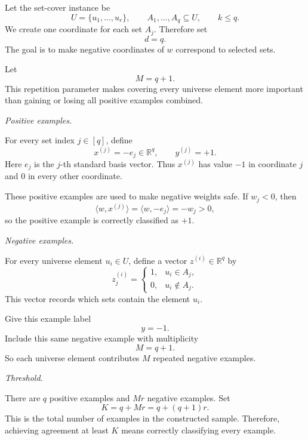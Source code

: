 \documentclass[11pt]{article}
\begin{document}
\begin{enumerate}
\begin{solutionbox}
        Let the set-cover instance be
        \[
        U=\{u_1,\ldots,u_r\},
        \qquad
        A_1,\ldots,A_q\subseteq U,
        \qquad
        k\le q.
        \]
        We create one coordinate for each set $A_j$. Therefore set
        \[
        d=q.
        \]
        The goal is to make negative coordinates of $w$ correspond to selected sets.

        Let
        \[
        M=q+1.
        \]
        This repetition parameter makes covering every universe element more important than
        gaining or losing all positive examples combined.

        \medskip

        \textit{Positive examples.}

        For every set index $j\in[q]$, define
        \[
        x^{(j)}=-e_j\in\mathbb{R}^q,
        \qquad
        y^{(j)}=+1.
        \]
        Here $e_j$ is the $j$-th standard basis vector. Thus $x^{(j)}$ has value $-1$ in
        coordinate $j$ and $0$ in every other coordinate.

        These positive examples are used to make negative weights safe. If $w_j<0$, then
        \[
        \langle w,x^{(j)}\rangle
        =
        \langle w,-e_j\rangle
        =
        -w_j
        >
        0,
        \]
        so the positive example is correctly classified as $+1$.

        \medskip

        \textit{Negative examples.}

        For every universe element $u_i\in U$, define a vector $z^{(i)}\in\mathbb{R}^q$ by
        \[
        z^{(i)}_j
        =
        \begin{cases}
        1, & u_i\in A_j,\\
        0, & u_i\notin A_j.
        \end{cases}
        \]
        This vector records which sets contain the element $u_i$.

        Give this example label
        \[
        y=-1.
        \]
        Include this same negative example with multiplicity
        \[
        M=q+1.
        \]
        So each universe element contributes $M$ repeated negative examples.

        \medskip

        \textit{Threshold.}

        There are $q$ positive examples and $Mr$ negative examples. Set
        \[
        \boxed{
        K=q+Mr=q+(q+1)r.
        }
        \]
        This is the total number of examples in the constructed sample. Therefore, achieving
        agreement at least $K$ means correctly classifying every example.


\end{solutionbox}
\end{enumerate}
\end{document}
